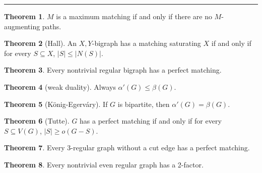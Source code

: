\documentclass{article}
\theoremstyle{definition}
\newtheorem{theorem}{Theorem}
\begin{document}
\hrule

\begin{theorem}
$M$ is a maximum matching if and only if there are no $M$-augmenting paths.
\end{theorem}

\begin{theorem}[Hall]
An $X,Y$-bigraph has a matching saturating $X$ if and only if for every $S\subseteq X$, $|S|\leq |N(S)|$.
\end{theorem}
\begin{theorem}
Every nontrivial regular bigraph has a perfect matching.
\end{theorem}

\begin{theorem}[weak duality]
Always $\alpha'(G)\leq \beta(G)$.
\end{theorem}
\begin{theorem}[K\"onig-Egerv\'ary]
If $G$ is bipartite, then $\alpha'(G)=\beta(G)$.
\end{theorem}

\begin{theorem}[Tutte]
$G$ has a perfect matching if and only if for every $S\subseteq V(G)$, $|S|\geq o(G-S)$.
\end{theorem}
\begin{theorem}
Every 3-regular graph without a cut edge has a perfect matching.
\end{theorem}
\begin{theorem}
Every nontrivial even regular graph has a 2-factor.
\end{theorem}
\end{document}
